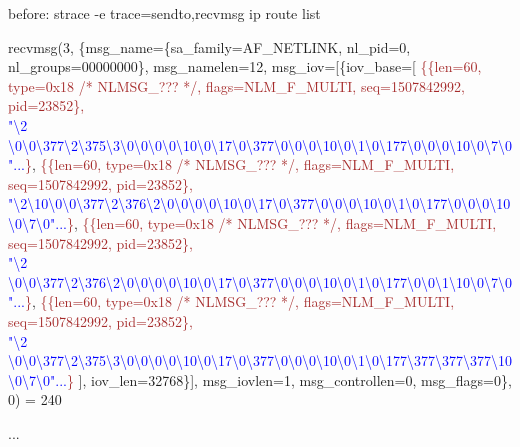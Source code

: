 \documentclass[unicode]{beamer}
\begin{document}
\begin{frame}[fragile]{\small before: strace -e trace=sendto,recvmsg ip route list}
{recvmsg(3, \{msg\_name=\{sa\_family=AF\_NETLINK, nl\_pid=0, nl\_groups=00000000\}, msg\_namelen=12, msg\_iov=[\{iov\_base=[
\textcolor{brown}{\{\{len=60, type=0x18 /* NLMSG\_??? */, flags=NLM\_F\_MULTI, seq=1507842992, pid=23852\}, \\
\textcolor{blue}{"\textbackslash{}2 \textbackslash{}0\textbackslash{}0\textbackslash{}377\textbackslash{}2\textbackslash{}375\textbackslash{}3\textbackslash{}0\textbackslash{}0\textbackslash{}0\textbackslash{}0\textbackslash{}10\textbackslash{}0\textbackslash{}17\textbackslash{}0\textbackslash{}377\textbackslash{}0\textbackslash{}0\textbackslash{}0\textbackslash{}10\textbackslash{}0\textbackslash{}1\textbackslash{}0\textbackslash{}177\textbackslash{}0\textbackslash{}0\textbackslash{}0\textbackslash{}10\textbackslash{}0\textbackslash{}7\textbackslash{}0"...}\}},
\textcolor{brown}{\{\{len=60, type=0x18 /* NLMSG\_??? */, flags=NLM\_F\_MULTI, seq=1507842992, pid=23852\}, \\
\textcolor{blue}{"\textbackslash{}2\textbackslash{}10\textbackslash{}0\textbackslash{}0\textbackslash{}377\textbackslash{}2\textbackslash{}376\textbackslash{}2\textbackslash{}0\textbackslash{}0\textbackslash{}0\textbackslash{}0\textbackslash{}10\textbackslash{}0\textbackslash{}17\textbackslash{}0\textbackslash{}377\textbackslash{}0\textbackslash{}0\textbackslash{}0\textbackslash{}10\textbackslash{}0\textbackslash{}1\textbackslash{}0\textbackslash{}177\textbackslash{}0\textbackslash{}0\textbackslash{}0\textbackslash{}10\textbackslash{}0\textbackslash{}7\textbackslash{}0"...}\}},
\textcolor{brown}{\{\{len=60, type=0x18 /* NLMSG\_??? */, flags=NLM\_F\_MULTI, seq=1507842992, pid=23852\}, \\
\textcolor{blue}{"\textbackslash{}2 \textbackslash{}0\textbackslash{}0\textbackslash{}377\textbackslash{}2\textbackslash{}376\textbackslash{}2\textbackslash{}0\textbackslash{}0\textbackslash{}0\textbackslash{}0\textbackslash{}10\textbackslash{}0\textbackslash{}17\textbackslash{}0\textbackslash{}377\textbackslash{}0\textbackslash{}0\textbackslash{}0\textbackslash{}10\textbackslash{}0\textbackslash{}1\textbackslash{}0\textbackslash{}177\textbackslash{}0\textbackslash{}0\textbackslash{}1\textbackslash{}10\textbackslash{}0\textbackslash{}7\textbackslash{}0"...}\}},
\textcolor{brown}{\{\{len=60, type=0x18 /* NLMSG\_??? */, flags=NLM\_F\_MULTI, seq=1507842992, pid=23852\}, \\
\textcolor{blue}{"\textbackslash{}2 \textbackslash{}0\textbackslash{}0\textbackslash{}377\textbackslash{}2\textbackslash{}375\textbackslash{}3\textbackslash{}0\textbackslash{}0\textbackslash{}0\textbackslash{}0\textbackslash{}10\textbackslash{}0\textbackslash{}17\textbackslash{}0\textbackslash{}377\textbackslash{}0\textbackslash{}0\textbackslash{}0\textbackslash{}10\textbackslash{}0\textbackslash{}1\textbackslash{}0\textbackslash{}177\textbackslash{}377\textbackslash{}377\textbackslash{}377\textbackslash{}10\textbackslash{}0\textbackslash{}7\textbackslash{}0"...}\}}
], iov\_len=32768\}], msg\_iovlen=1, msg\_controllen=0, msg\_flags=0\}, 0) = 240

...
}
\end{frame}
\end{document}
